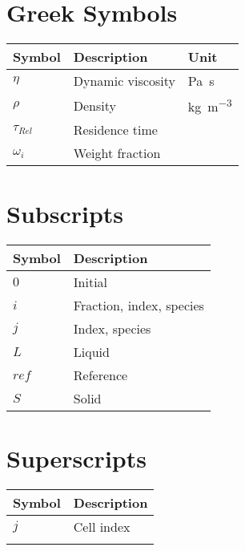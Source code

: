 \section*{Greek Symbols}
\begin{longtabu} to \textwidth {XX[4]X[c]}
	\toprule
	\textbf{Symbol} 		& \textbf{Description}		 							& \textbf{Unit} \\ 
	\midrule		\endhead
	\bottomrule 	\endfoot
	$\eta$			& Dynamic viscosity												& \si{\pascal \second} \\
	$\rho$			& Density														& \si{\kilo \gram \per \meter^3}\\
	$\tau_{Rel}$	& Residence time												& \textendash \\
	$\omega_i$		& Weight fraction												& \textendash \\
\end{longtabu} 

\section*{Subscripts}
\begin{longtabu} to \textwidth {XX[5]}
	\toprule 
	\textbf{Symbol} 		& \textbf{Description} \\ 
	\midrule 		\endhead
	\bottomrule		\endfoot
	$0$				& Initial\\
	$i$				& Fraction, index, species\\
	$j$				& Index, species\\
	$L$				& Liquid \\
	$ref$			& Reference \\
	$S$				& Solid \\
\end{longtabu} 

\section*{Superscripts}
\begin{longtabu} to \textwidth {XX[5]}
	\toprule 
	\textbf{Symbol} 		& \textbf{Description} \\ 
	\midrule 		\endhead
	$j$ 			& Cell index \\
	\bottomrule		\endfoot
\end{longtabu} 

\clearpage

